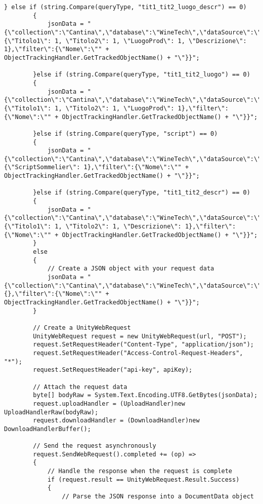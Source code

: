 \begin{lstlisting}[caption=Codice sorgente dello script \textit{MongoDBConnector}, label=lst:MongoDBConnectorScript, captionpos=b, basicstyle=\scriptsize]
        } else if (string.Compare(queryType, "tit1_tit2_luogo_descr") == 0)
        {
            jsonData = "{\"collection\":\"Cantina\",\"database\":\"WineTech\",\"dataSource\":\"ClusterWineTech\",\"projection\":{\"Titolo1\": 1, \"Titolo2\": 1, \"LuogoProd\": 1, \"Descrizione\": 1},\"filter\":{\"Nome\":\"" + ObjectTrackingHandler.GetTrackedObjectName() + "\"}}";
            
        }else if (string.Compare(queryType, "tit1_tit2_luogo") == 0)
        {
            jsonData = "{\"collection\":\"Cantina\",\"database\":\"WineTech\",\"dataSource\":\"ClusterWineTech\",\"projection\":{\"Titolo1\": 1, \"Titolo2\": 1, \"LuogoProd\": 1},\"filter\":{\"Nome\":\"" + ObjectTrackingHandler.GetTrackedObjectName() + "\"}}";
            
        }else if (string.Compare(queryType, "script") == 0)
        {
            jsonData = "{\"collection\":\"Cantina\",\"database\":\"WineTech\",\"dataSource\":\"ClusterWineTech\",\"projection\":{\"ScriptSommelier\": 1},\"filter\":{\"Nome\":\"" + ObjectTrackingHandler.GetTrackedObjectName() + "\"}}";
            
        }else if (string.Compare(queryType, "tit1_tit2_descr") == 0)
        {
            jsonData = "{\"collection\":\"Cantina\",\"database\":\"WineTech\",\"dataSource\":\"ClusterWineTech\",\"projection\":{\"Titolo1\": 1, \"Titolo2\": 1, \"Descrizione\": 1},\"filter\":{\"Nome\":\"" + ObjectTrackingHandler.GetTrackedObjectName() + "\"}}";
        }
        else
        {
            // Create a JSON object with your request data
            jsonData = "{\"collection\":\"Cantina\",\"database\":\"WineTech\",\"dataSource\":\"ClusterWineTech\",\"projection\":{},\"filter\":{\"Nome\":\"" + ObjectTrackingHandler.GetTrackedObjectName() + "\"}}";
        }
        
        // Create a UnityWebRequest
        UnityWebRequest request = new UnityWebRequest(url, "POST");
        request.SetRequestHeader("Content-Type", "application/json");
        request.SetRequestHeader("Access-Control-Request-Headers", "*");
        request.SetRequestHeader("api-key", apiKey);

        // Attach the request data
        byte[] bodyRaw = System.Text.Encoding.UTF8.GetBytes(jsonData);
        request.uploadHandler = (UploadHandler)new UploadHandlerRaw(bodyRaw);
        request.downloadHandler = (DownloadHandler)new DownloadHandlerBuffer();

        // Send the request asynchronously
        request.SendWebRequest().completed += (op) =>
        {
            // Handle the response when the request is complete
            if (request.result == UnityWebRequest.Result.Success)
            {
                // Parse the JSON response into a DocumentData object
           

\end{lstlisting}
